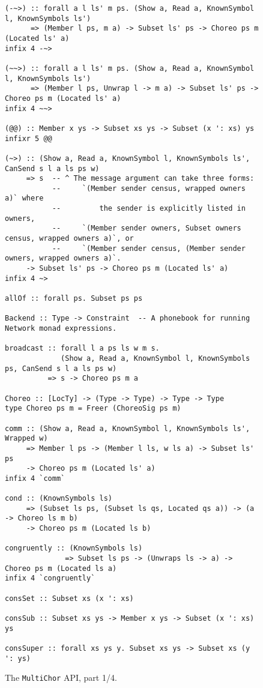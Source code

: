 \documentclass[sigplan,screen]{acmart}
\newcommand{\MultiChor}{\texttt{Multi\-Chor}\xspace}
\begin{document}
\begin{figure*}
\begin{mdframed}
\begin{verbatim}
(-~>) :: forall a l ls' m ps. (Show a, Read a, KnownSymbol l, KnownSymbols ls')
      => (Member l ps, m a) -> Subset ls' ps -> Choreo ps m (Located ls' a)
infix 4 -~>

(~~>) :: forall a l ls' m ps. (Show a, Read a, KnownSymbol l, KnownSymbols ls')
      => (Member l ps, Unwrap l -> m a) -> Subset ls' ps -> Choreo ps m (Located ls' a)
infix 4 ~~>

(@@) :: Member x ys -> Subset xs ys -> Subset (x ': xs) ys
infixr 5 @@

(~>) :: (Show a, Read a, KnownSymbol l, KnownSymbols ls', CanSend s l a ls ps w)
     => s  -- ^ The message argument can take three forms:
           --     `(Member sender census, wrapped owners a)` where
           --         the sender is explicitly listed in owners,
           --     `(Member sender owners, Subset owners census, wrapped owners a)`, or
           --     `(Member sender census, (Member sender owners, wrapped owners a)`.
     -> Subset ls' ps -> Choreo ps m (Located ls' a)
infix 4 ~>

allOf :: forall ps. Subset ps ps

Backend :: Type -> Constraint  -- A phonebook for running Network monad expressions.

broadcast :: forall l a ps ls w m s.
             (Show a, Read a, KnownSymbol l, KnownSymbols ps, CanSend s l a ls ps w)
          => s -> Choreo ps m a

Choreo :: [LocTy] -> (Type -> Type) -> Type -> Type
type Choreo ps m = Freer (ChoreoSig ps m)

comm :: (Show a, Read a, KnownSymbol l, KnownSymbols ls', Wrapped w)
     => Member l ps -> (Member l ls, w ls a) -> Subset ls' ps
     -> Choreo ps m (Located ls' a)
infix 4 `comm`

cond :: (KnownSymbols ls)
     => (Subset ls ps, (Subset ls qs, Located qs a)) -> (a -> Choreo ls m b)
     -> Choreo ps m (Located ls b)

congruently :: (KnownSymbols ls)
              => Subset ls ps -> (Unwraps ls -> a) -> Choreo ps m (Located ls a)
infix 4 `congruently`

consSet :: Subset xs (x ': xs)

consSub :: Subset xs ys -> Member x ys -> Subset (x ': xs) ys

consSuper :: forall xs ys y. Subset xs ys -> Subset xs (y ': ys)
\end{verbatim}
\caption{The \MultiChor API, part 1/4.}
\label{fig:other-api}
\end{mdframed}
\end{figure*}
\end{document}
